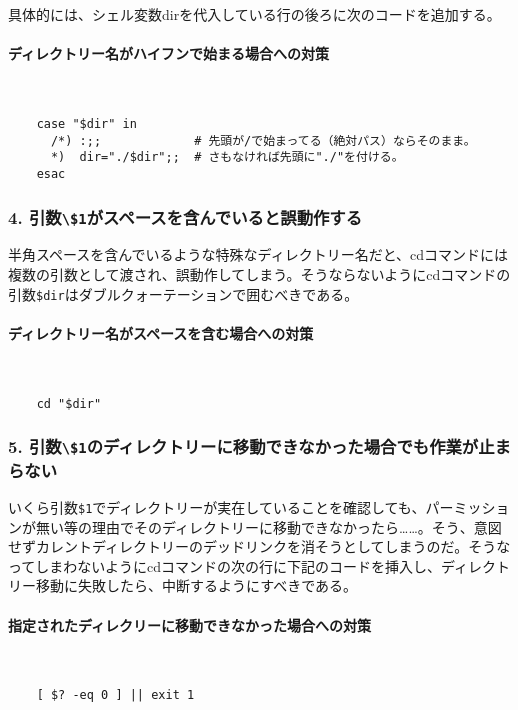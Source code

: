 具体的には、シェル変数dirを代入している行の後ろに次のコードを追加する。

\paragraph{ディレクトリー名がハイフンで始まる場合への対策} 　\\
\begin{frameboxit}{160.0mm}
\begin{verbatim}
	case "$dir" in
	  /*) :;;             # 先頭が/で始まってる（絶対パス）ならそのまま。
	  *)  dir="./$dir";;  # さもなければ先頭に"./"を付ける。
	esac
\end{verbatim}
\end{frameboxit}

\subsubsection*{4. 引数\verb|\$1|がスペースを含んでいると誤動作する}

半角スペースを含んでいるような特殊なディレクトリー名だと、cdコマンドには複数の引数として渡され、誤動作してしまう。そうならないようにcdコマンドの引数\verb|$dir|はダブルクォーテーションで囲むべきである。

\paragraph{ディレクトリー名がスペースを含む場合への対策} 　\\
\begin{frameboxit}{160.0mm}
\begin{verbatim}
	cd "$dir"
\end{verbatim}
\end{frameboxit}

\subsubsection*{5. 引数\verb|\$1|のディレクトリーに移動できなかった場合でも作業が止まらない}

いくら引数\verb|$1|でディレクトリーが実在していることを確認しても、パーミッションが無い等の理由でそのディレクトリーに移動できなかったら……。そう、意図せずカレントディレクトリーのデッドリンクを消そうとしてしまうのだ。そうなってしまわないようにcdコマンドの次の行に下記のコードを挿入し、ディレクトリー移動に失敗したら、中断するようにすべきである。

\paragraph{指定されたディレクリーに移動できなかった場合への対策} 　\\
\begin{frameboxit}{160.0mm}
\begin{verbatim}
	[ $? -eq 0 ] || exit 1
\end{verbatim}
\end{frameboxit}

